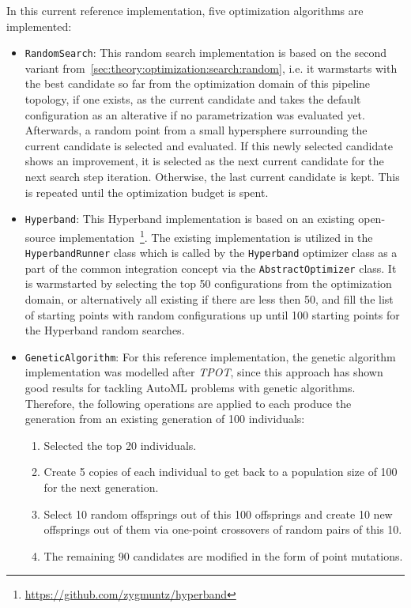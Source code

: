 In this current reference implementation, five optimization algorithms are implemented:
\begin{itemize}
    \item \texttt{RandomSearch}: This random search implementation is based on the second variant from~\ref{sec:theory:optimization:search:random}, i.e. it warmstarts with the best candidate so far from the optimization domain of this pipeline topology, if one exists, as the current candidate and takes the default configuration as an alterative if no parametrization was evaluated yet.
    Afterwards, a random point from a small hypersphere surrounding the current candidate is selected and evaluated.
    If this newly selected candidate shows an improvement, it is selected as the next current candidate for the next search step iteration.
    Otherwise, the last current candidate is kept.
    This is repeated until the optimization budget is spent.
    \item \texttt{Hyperband}: This Hyperband implementation is based on an existing open-source implementation~\footnote{\url{https://github.com/zygmuntz/hyperband}}.
    The existing implementation is utilized in the \texttt{HyperbandRunner} class which is called by the \texttt{Hyperband} optimizer class as a part of the common integration concept via the \texttt{AbstractOptimizer} class.
    It is warmstarted by selecting the top 50 configurations from the optimization domain, or alternatively all existing if there are less then 50, and fill the list of starting points with random configurations up until 100 starting points for the Hyperband random searches.
    \item \texttt{GeneticAlgorithm}: For this reference implementation, the genetic algorithm implementation was modelled after \textit{TPOT}, since this approach has shown good results for tackling AutoML problems with genetic algorithms.
    Therefore, the following operations are applied to each produce the generation from an existing generation of 100 individuals:
        \begin{enumerate}
            \item Selected the top 20 individuals.
            \item Create 5 copies of each individual to get back to a population size of 100 for the next generation.
            \item Select 10 random offsprings out of this 100 offsprings and create 10 new offsprings out of them via one-point crossovers of random pairs of this 10.
            \item The remaining 90 candidates are modified in the form of point mutations.

\end{enumerate}
\end{itemize}
